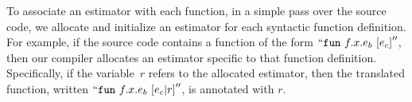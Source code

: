 To associate an
estimator with each function, in a simple pass over the source code,
we allocate and initialize an estimator for each
syntactic function definition.  For
example, if the source code contains a function of the form
$``{{\mathtt{{fun}}}~{f}.{x}.{e_b}~[{e_c}]}''$, then our compiler allocates an
estimator specific to that function definition.  Specifically, if the
variable~$r$ refers to the allocated estimator, then the translated
function, written $``{{\mathtt{{fun}}}~{f}.{x}.{e_b}~[{e_c}|{r}]}''$, 
is annotated with $r$.




\begin{figure}




\end{figure}
